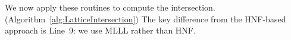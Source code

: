 






We now apply these routines to compute the intersection. (Algorithm~\ref{alg:LatticeIntersection})
The key difference from the HNF-based approach is Line~9: we use MLLL rather than HNF.

